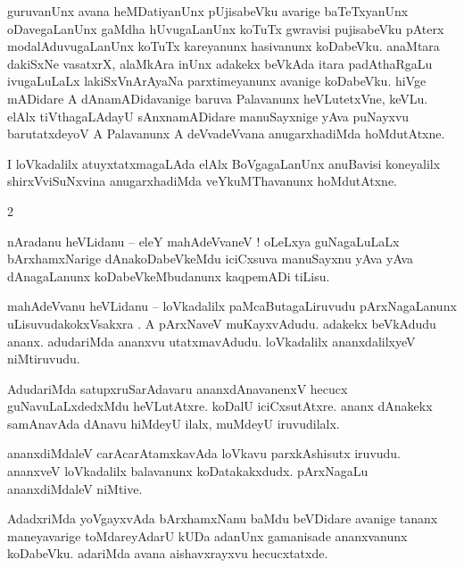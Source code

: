 \documentclass{article}
\begin{document}
\begin{mn}%
guruvanUnx avana heMDatiyanUnx pUjisabeVku avarige baTeTxyanUnx oDavegaLanUnx gaMdha hUvugaLanUnx koTuTx gwravisi 
pujisabeVku pAterx modalAduvugaLanUnx koTuTx kareyanunx hasivanunx koDabeVku. anaMtara dakiSxNe vasatxrX, alaMkAra 
inUnx adakekx beVkAda itara padAthaRgaLu ivugaLuLaLx lakiSxVnArAyaNa parxtimeyanunx avanige koDabeVku. hiVge mADidare 
A dAnamADidavanige baruva Palavanunx heVLutetxVne, keVLu. elAlx tiVthagaLAdayU sAnxnamADidare manuSayxnige yAva 
puNayxvu barutatxdeyoV A Palavanunx A deVvadeVvana anugarxhadiMda hoMdutAtxne.
\end{mn}

\begin{mn}%
I loVkadalilx atuyxtatxmagaLAda elAlx BoVgagaLanUnx anuBavisi koneyalilx shirxVviSuNxvina anugarxhadiMda 
veYkuMThavanunx hoMdutAtxne.
\end{mn}

\begin{mn}
2
\end{mn}
\begin{mn}%
nAradanu heVLidanu -- eleY mahAdeVvaneV ! oLeLxya guNagaLuLaLx bArxhamxNarige dAnakoDabeVkeMdu 
iciCxsuva manuSayxnu yAva yAva dAnagaLanunx koDabeVkeMbudanunx kaqpemADi tiLisu.
\end{mn}

\begin{mn}%
mahAdeVvanu heVLidanu -- loVkadalilx paMcaButagaLiruvudu pArxNagaLanunx uLisuvudakokxVsakxra . A 
pArxNaveV muKayxvAdudu. adakekx beVkAdudu ananx. adudariMda ananxvu utatxmavAdudu. loVkadalilx 
ananxdalilxyeV niMtiruvudu.
\end{mn}

\begin{mn}%
AdudariMda satupxruSarAdavaru ananxdAnavanenxV hecucx guNavuLaLxdedxMdu heVLutAtxre. koDalU 
iciCxsutAtxre. ananx dAnakekx samAnavAda dAnavu hiMdeyU ilalx, muMdeyU iruvudilalx.
\end{mn}

\begin{mn}%
ananxdiMdaleV carAcarAtamxkavAda loVkavu parxkAshisutx iruvudu. ananxveV loVkadalilx balavanunx 
koDatakakxdudx. pArxNagaLu ananxdiMdaleV niMtive.
\end{mn}

\begin{mn}%
AdadxriMda yoVgayxvAda bArxhamxNanu baMdu beVDidare avanige tananx maneyavarige toMdareyAdarU kUDa 
adanUnx gamanisade ananxvanunx koDabeVku. adariMda avana aishavxrayxvu hecucxtatxde.
\end{mn}
\end{document}
